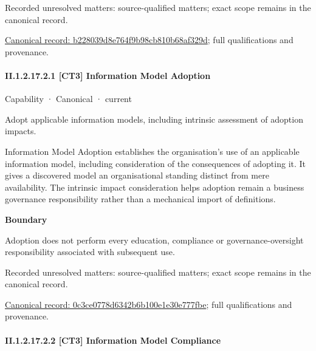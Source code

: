 {\small Recorded unresolved matters: source-qualified matters; exact scope remains in the canonical record.}\par
{\footnotesize \href{../../../../continuum/strategy/capability/b228039d8e764f9b98cb810b68af329d.md}{Canonical record: b228039d8e764f9b98cb810b68af329d}; full qualifications and provenance.}\par
\paragraph*{II.1.2.17.2.1 [CT3] Information Model Adoption}
\label{navigation:II.1.2.17.2.1}

\label{element:0c3ce0778d6342b6b100e1e30e777fbe}
{\small Capability · Canonical · current}\par

Adopt applicable information models, including intrinsic assessment of adoption impacts.



Information Model Adoption establishes the organisation's use of an applicable information model, including consideration of the consequences of adopting it. It gives a discovered model an organisational standing distinct from mere availability. The intrinsic impact consideration helps adoption remain a business governance responsibility rather than a mechanical import of definitions.



\textbf{Boundary}



Adoption does not perform every education, compliance or governance-oversight responsibility associated with subsequent use.


{\small Recorded unresolved matters: source-qualified matters; exact scope remains in the canonical record.}\par
{\footnotesize \href{../../../../continuum/strategy/capability/0c3ce0778d6342b6b100e1e30e777fbe.md}{Canonical record: 0c3ce0778d6342b6b100e1e30e777fbe}; full qualifications and provenance.}\par
\paragraph*{II.1.2.17.2.2 [CT3] Information Model Compliance}
\label{navigation:II.1.2.17.2.2}

